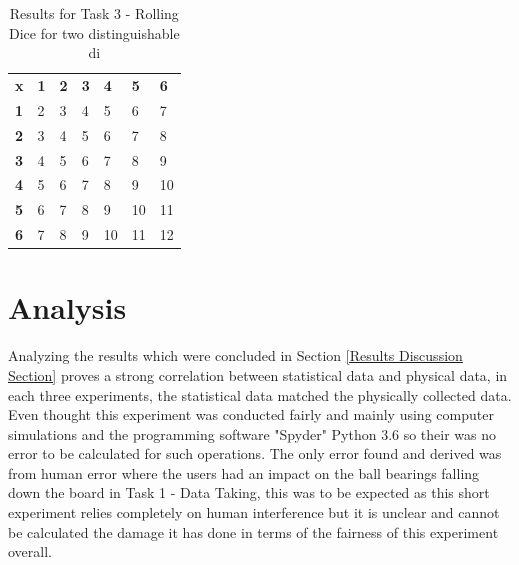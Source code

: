 \documentclass[11pt]{article}
\begin{document}
\begin{table}[H]
\centering
\caption{Results for Task 3 - Rolling Dice for two distinguishable di}
\label{Dice Rolling table no. 2}
\begin{tabular}{lllllll}
\textbf{x} & \textbf{1} & \textbf{2} & \textbf{3} & \textbf{4} & \textbf{5} & \textbf{6} \\
\textbf{1} & 2          & 3          & 4          & 5          & 6          & 7          \\
\textbf{2} & 3          & 4          & 5          & 6          & 7          & 8          \\
\textbf{3} & 4          & 5          & 6          & 7          & 8          & 9          \\
\textbf{4} & 5          & 6          & 7          & 8          & 9          & 10         \\
\textbf{5} & 6          & 7          & 8          & 9          & 10         & 11         \\
\textbf{6} & 7          & 8          & 9          & 10         & 11         & 12        
\end{tabular}
\end{table}




\section{Analysis}
\label{Analysis Section}

Analyzing the results which were concluded in Section \ref{Results Discussion Section} proves a strong correlation between statistical data and physical data, in each three experiments, the statistical data matched the physically collected data. Even thought this experiment was conducted fairly and mainly using computer simulations and the programming software "Spyder" Python 3.6 so their was no error to be calculated for such operations. The only error found and derived was from human error where the users had an impact on the ball bearings falling down the board in Task 1 - Data Taking, this was to be expected as this short experiment relies completely on human interference but it is unclear and cannot be calculated the damage it has done in terms of the fairness of this experiment overall. 
\end{document}
